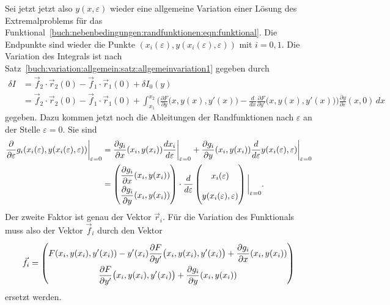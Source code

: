 Sei jetzt jetzt also $y(x,\varepsilon)$ wieder eine allgemeine Variation
einer Lösung des Extremalproblems für das
Funktional~\eqref{buch:nebenbedingungen:randfunktionen:eqn:funktional}.
Die Endpunkte sind wieder die Punkte
$(x_i(\varepsilon),y(x_i(\varepsilon),\varepsilon))$ mit $i=0,1$.
Die Variation des Integrals ist nach
Satz~\ref{buch:variation:allgemein:satz:allgemeinvariation1} 
gegeben durch
\begin{align*}
\delta I
&=
\vec{f}_2\cdot \vec{r}_2(0) - \vec{f}_1\cdot\vec{r}_1(0)
+
\delta I_0(y)
\\
&=
\vec{f}_2\cdot \vec{r}_2(0) - \vec{f}_1\cdot\vec{r}_1(0)
+
\int_{x_1}^{x_2}
\biggl(
\frac{\partial F}{\partial y}\bigl(x,y(x),y'(x)\bigr)
-
\frac{d}{dx}\frac{\partial F}{\partial y'}\bigl(x,y(x),y'(x)\bigr)
\biggr)
\frac{\partial y}{\partial\varepsilon}(x,0)
\,dx
\end{align*}
gegeben.
Dazu kommen jetzt noch die Ableitungen der Randfunktionen nach
$\varepsilon$ an der Stelle $\varepsilon=0$.
Sie sind
\begin{align*}
\frac{\partial}{\partial\varepsilon}
g_i(x_i(\varepsilon),y(x_i(\varepsilon),\varepsilon))
\bigg|_{\varepsilon=0}
&=
\frac{\partial g_i}{\partial x}(x_i,y(x_i))
\frac{d x_i}{d\varepsilon}\bigg|_{\varepsilon=0}
+
\frac{\partial g_i}{\partial y}(x_i,y(x_i))
\frac{d}{d\varepsilon}y(x_i(\varepsilon),\varepsilon)
\bigg|_{\varepsilon=0}
\\
&=
\bgroup
\renewcommand\arraystretch{2}
\begin{pmatrix}
\displaystyle
\frac{\partial g_i}{\partial x}(x_i,y(x_i))
\\
\displaystyle
\frac{\partial g_i}{\partial y}(x_i,y(x_i))
\end{pmatrix}
\egroup
\cdot
\frac{d}{d\varepsilon}
\begin{pmatrix}
x_i(\varepsilon)\\
y(x_i(\varepsilon),\varepsilon)
\end{pmatrix}
\bigg|_{\varepsilon=0}.
\end{align*}
Der zweite Faktor ist genau der Vektor $\vec{r}_i$. 
Für die Variation des Funktionals muss also der Vektor $\vec{f}_i$ durch
den Vektor
\begin{equation}
\vec{f}_i
=
\renewcommand\arraystretch{2}
\begin{pmatrix}
\displaystyle
F(x_i,y(x_i),y'(x_i))
-
y'(x_i) \frac{\partial F}{\partial y'}\bigl(x_i,y(x_i),y'(x_i)\bigr)
+
\frac{\partial g_i}{\partial x}(x_i,y(x_i))
\\
\displaystyle
\frac{\partial F}{\partial y'}\bigl(x_i,y(x_i),y'(x_i)\bigr)
+
\frac{\partial g_i}{\partial y}(x_i,y(x_i))
\end{pmatrix}
\label{buch:nebenbedingungen:randfunktionen:eqn:fnew}
\end{equation}
ersetzt werden.

